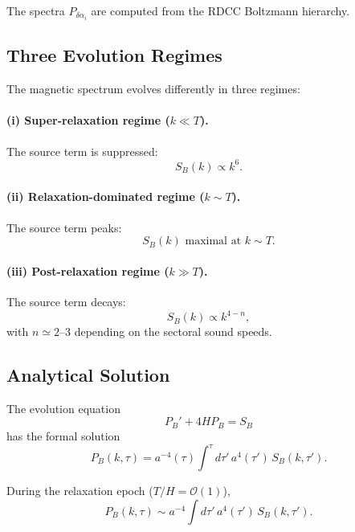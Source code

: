 \documentclass[11pt,a4paper]{article}
\begin{document}
The spectra $P_{\delta\alpha_{i}}$ are computed from the RDCC Boltzmann hierarchy.

\subsection{Three Evolution Regimes}

The magnetic spectrum evolves differently in three regimes:

\paragraph{(i) Super-relaxation regime ($k \ll T$).}
The source term is suppressed:
\begin{equation}
S_{B}(k) \propto k^{6}.
\end{equation}

\paragraph{(ii) Relaxation-dominated regime ($k \sim T$).}
The source term peaks:
\begin{equation}
S_{B}(k) \text{ maximal at } k \sim T.
\end{equation}

\paragraph{(iii) Post-relaxation regime ($k \gg T$).}
The source term decays:
\begin{equation}
S_{B}(k) \propto k^{4-n},
\end{equation}
with $n \simeq 2$–$3$ depending on the sectoral sound speeds.

\subsection{Analytical Solution}

The evolution equation
\begin{equation}
P_{B}' + 4H P_{B} = S_{B}
\end{equation}
has the formal solution
\begin{equation}
P_{B}(k,\tau)
=
a^{-4}(\tau)
\int^{\tau}
d\tau'\,
a^{4}(\tau')\,
S_{B}(k,\tau').
\end{equation}

During the relaxation epoch ($T/H = \mathcal{O}(1)$),
\begin{equation}
P_{B}(k,\tau)
\sim
a^{-4}
\int d\tau'\,
a^{4}(\tau')\,
S_{B}(k,\tau').
\end{equation}
\end{document}
